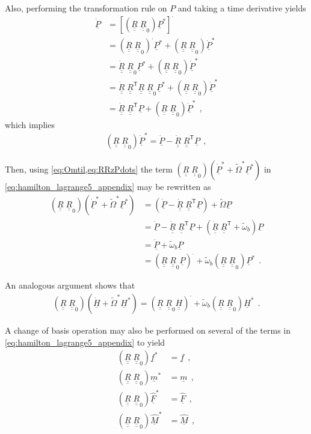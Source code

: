 \documentclass[12pt,a4paper,oneside,english]{abntex2} %
\newcommand{\vect}[1]{\underline{#1}}
\def\tens#1{\underline{\underline{#1}}}
\def\til#1{\widetilde{#1}}
\def\lb{\left[}
\def\rb{\right]}
\def\lp{\left(}
\def\rp{\right)}
\def\T{\mathsf{T}}
\def\dotout{^{\boldsymbol{\cdot}}}
\def\R{\tens{R}}
\def\RT{\R^\T}
\def\Rdot{\dot{\R}}
\def\Rz{\R_0}
\def\omtil{\til{\omega}_b}
\def\Omtil{\til{\Omega}}
\def\Omtils{\Omtil^{*}}
\def\P{\vect{P}}
\def\Pdot{\dot{\P}}
\def\Ps{\P^*}
\def\Pdots{\dot{\P}^*}
\def\Hv{\vect{H}}
\def\Hvdot{\dot{\Hv}}
\def\Hvs{\Hv^*}
\def\H{\tens{H}}
\def\F{\vect{F}}
\def\Fhat{\widehat{\F}}
\def\Fhats{\Fhat^*}
\def\M{\vect{M}}
\def\Mhat{\widehat{\M}}
\def\Mhats{\Mhat^*}
\def\f{\vect{f}}
\def\fs{\f^*}
\def\m{\vect{m}}
\def\ms{\m^*}
\def\RRz{\lp\R\;\Rz\rp}
\begin{document}
\begin{apendicesenv}
Also, performing the transformation rule on $P$ and taking a time derivative yields
\begin{align}
    \Pdot &= \lb\RRz\Ps\rb\dotout
    \nonumber \\
    &= \RRz\dotout\Ps + \RRz\Pdots
    \nonumber \\
    &= \Rdot\;\Rz\Ps + \RRz\Pdots
    \nonumber \\
    &= \Rdot\;\RT\R\;\Rz\Ps + \RRz\Pdots
    \nonumber \\
    &= \Rdot\;\RT\P + \RRz\Pdots \ \ ,
    \label{eq:Pdot}
\end{align}
which implies
\begin{align}
    \RRz\Pdots = \Pdot - \Rdot\;\RT\P \ \ ,
    \label{eq:RRzPdots}
\end{align}

Then, using \cref{eq:Omtil,eq:RRzPdots} the term $\RRz\lp\Pdots+\Omtils\Ps\rp$ in \cref{eq:hamilton_lagrange5_appendix} may be rewritten as
\begin{align}
	\RRz\lp\Pdots+\Omtils\Ps\rp &= \lp\Pdot-\Rdot\;\RT\P\rp + \Omtil\P
	\nonumber \\
	&= \Pdot-\Rdot\;\RT\P + \lp\Rdot\;\RT+\omtil\rp\P
	\nonumber \\
	&= \Pdot + \omtil\P
	\nonumber \\
	&= \lp\R\;\Rz\P\rp\dotout + \omtil\RRz\Ps \ \ .
	\label{eq:RRz_Pdots_plus_OmtilsPs}
\end{align}

An analogous argument shows that 
\begin{align}
    \RRz\lp\Hvdot+\Omtils\Hvs\rp = \lp\R\;\Rz\H\rp\dotout + \omtil\RRz\Hvs \ \ .
    \label{eq:RRz_Hdots_plus_OmtilsHs}
\end{align}

A change of basis operation may also be performed on several of the terms in \cref{eq:hamilton_lagrange5_appendix} to yield
\begin{equation}
    \begin{aligned}
		\RRz\fs &= \f \ \ ,
		\\
		\RRz\ms &= \m \ \ ,
		\\
		\RRz\Fhats &= \Fhat \ \ ,
		\\
		\RRz\Mhats &= \Mhat \ \ ,
	    \label{eq:transform_terms}
    \end{aligned}
\end{equation}


\end{apendicesenv}
\end{document}
